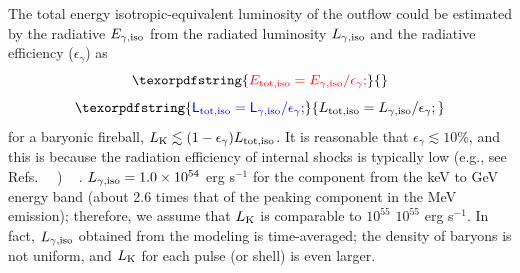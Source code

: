 \documentclass[prd,twocolumn,amsmath,amssymb,aps,linenumbers]{revtex4-2} %
\providecommand{\DIFaddtex}[1]{{\protect\color{blue} \sf #1}} %
\providecommand{\DIFdeltex}[1]{{\protect\color{red} \scriptsize #1}} %
\providecommand{\DIFaddbegin}{} %
\providecommand{\DIFaddend}{} %
\providecommand{\DIFdelbegin}{} %
\providecommand{\DIFdelend}{} %
\providecommand{\DIFadd}[1]{\texorpdfstring{\DIFaddtex{#1}}{#1}} %
\providecommand{\DIFdel}[1]{\texorpdfstring{\DIFdeltex{#1}}{}} %
\newcommand{\DIFscaledelfig}{0.5}
\newlength{\DIFdelgraphicswidth} %
\newlength{\DIFdelgraphicsheight} %
\newcommand{\DIFaddincludegraphics}[2][]{{\color{blue}\fbox{\DIFOincludegraphics[#1]{#2}}}} %
\newcommand{\DIFdelincludegraphics}[2][]{%
\sbox{\DIFdelgraphicsbox}{\DIFOincludegraphics[#1]{#2}}%
\settoboxwidth{\DIFdelgraphicswidth}{\DIFdelgraphicsbox} %
\settoboxtotalheight{\DIFdelgraphicsheight}{\DIFdelgraphicsbox} %
\scalebox{\DIFscaledelfig}{%
\parbox[b]{\DIFdelgraphicswidth}{\usebox{\DIFdelgraphicsbox}\\[-\baselineskip] \rule{\DIFdelgraphicswidth}{0em}}\llap{\resizebox{\DIFdelgraphicswidth}{\DIFdelgraphicsheight}{%
\setlength{\unitlength}{\DIFdelgraphicswidth}%
\begin{picture}(1,1)%
\thicklines\linethickness{2pt} %
{\color[rgb]{1,0,0}\put(0,0){\framebox(1,1){}}}%
{\color[rgb]{1,0,0}\put(0,0){\line( 1,1){1}}}%
{\color[rgb]{1,0,0}\put(0,1){\line(1,-1){1}}}%
\end{picture}%
}\hspace*{3pt}}} %
} %
\DeclareRobustCommand{\DIFaddbegin}{\DIFOaddbegin \let\includegraphics\DIFaddincludegraphics} %
\DeclareRobustCommand{\DIFaddend}{\DIFOaddend \let\includegraphics\DIFOincludegraphics} %
\DeclareRobustCommand{\DIFdelbegin}{\DIFOdelbegin \let\includegraphics\DIFdelincludegraphics} %
\DeclareRobustCommand{\DIFdelend}{\DIFOaddend \let\includegraphics\DIFOincludegraphics} %
\begin{document}
The total \DIFdelbegin \DIFdel{energy }\DIFdelend \DIFaddbegin \DIFadd{isotropic-equivalent luminosity }\DIFaddend of the outflow could be estimated \DIFdelbegin \DIFdel{by the radiative $E_{\gamma, \rm iso}$ }\DIFdelend \DIFaddbegin \DIFadd{from the radiated luminosity $L_{\gamma, \rm iso}$ }\DIFaddend and the radiative efficiency ($\epsilon_\gamma$) as
\DIFdelbegin \begin{displaymath}
    \DIFdel{E_{\rm tot, iso}= E_{\gamma, \rm iso}/\epsilon_\gamma;
}\end{displaymath}%
\DIFdelend \DIFaddbegin \begin{equation}
    \DIFadd{L_{\rm tot, iso}= L_{\gamma, \rm iso}/\epsilon_\gamma;
}\end{equation}\DIFaddend 
for \DIFaddbegin \DIFadd{a }\DIFaddend baryonic fireball, $L_{\rm K}\lesssim (1-\epsilon_\gamma)L_{\rm tot, iso}$.
It is reasonable that $\epsilon_\gamma\lesssim10\%$, \DIFdelbegin \DIFdel{and this is }\DIFdelend because the radiation efficiency of internal shocks is typically low \DIFdelbegin \DIFdel{(e.g., see Refs.~\mbox{%
\citep[][]{2011ApJ...726...90Z,2008FrPhC...3..306F}}\hskip0pt%
)}\DIFdelend \DIFaddbegin \DIFadd{\mbox{%
\citep[e.g.,][]{2011ApJ...726...90Z,2008FrPhC...3..306F}}\hskip0pt%
}\DIFaddend . $L_{\gamma, \rm iso}=1.0\times10^{54}$ erg s$^{-1}$ for the component from \DIFaddbegin \DIFadd{the }\DIFaddend keV to GeV energy band (about 2.6 times that of the peaking component in \DIFaddbegin \DIFadd{the }\DIFaddend MeV emission); therefore, we assume that $L_{\rm K}$ is comparable to \DIFdelbegin \DIFdel{$ 10^{55}$ }\DIFdelend \DIFaddbegin \DIFadd{$10^{55}$ }\DIFaddend erg s$^{-1}$.
In fact, $L_{\gamma, \rm iso}$ obtained from the modeling is time-averaged; the density of baryons is not uniform, and $L_{\rm K}$ for each pulse (or shell) is even larger.
\end{document}
